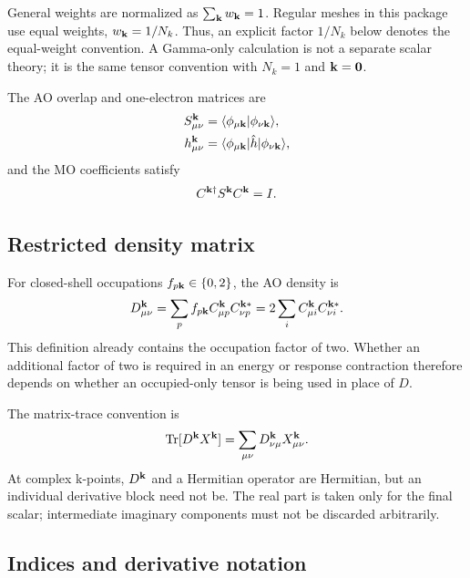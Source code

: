 General weights are normalized as $\sum_{\mathbf{k}} w_{\mathbf{k}}=1$.  Regular meshes in this
package use equal weights, $w_{\mathbf{k}}=1/N_k$.  Thus, an explicit factor $1/N_k$
below denotes the equal-weight convention.  A Gamma-only calculation is not a
separate scalar theory; it is the same tensor convention with $N_k=1$ and
$\mathbf{k}=\mathbf0$.

The AO overlap and one-electron matrices are
\begin{align}
  S_{\mu\nu}^{\mathbf{k}}
  &=\langle\phi_{\mu\mathbf{k}}|\phi_{\nu\mathbf{k}}\rangle,\\
  h_{\mu\nu}^{\mathbf{k}}
  &=\langle\phi_{\mu\mathbf{k}}|\hat h|\phi_{\nu\mathbf{k}}\rangle,
  \label{eq:ao-matrices}
\end{align}
and the MO coefficients satisfy
\begin{equation}
  C^{\mathbf{k}\dagger}S^{\mathbf{k}}C^{\mathbf{k}}=I.
  \label{eq:mo-orthonormality}
\end{equation}

\subsection{Restricted density matrix}

For closed-shell occupations $f_{p\mathbf{k}}\in\{0,2\}$, the AO density is
\begin{equation}
  D_{\mu\nu}^{\mathbf{k}}
  =\sum_p f_{p\mathbf{k}}C_{\mu p}^{\mathbf{k}}C_{\nu p}^{\mathbf{k} *}
  =2\sum_i C_{\mu i}^{\mathbf{k}}C_{\nu i}^{\mathbf{k} *}.
  \label{eq:restricted-density}
\end{equation}
This definition already contains the occupation factor of two.  Whether an
additional factor of two is required in an energy or response contraction
therefore depends on whether an occupied-only tensor is being used in place of
$D$.

The matrix-trace convention is
\begin{equation}
  \operatorname{Tr}[D^{\mathbf{k}}X^{\mathbf{k}}]
  =\sum_{\mu\nu}D_{\nu\mu}^{\mathbf{k}}X_{\mu\nu}^{\mathbf{k}}.
  \label{eq:trace-convention}
\end{equation}
At complex k-points, $D^{\mathbf{k}}$ and a Hermitian operator are Hermitian, but an
individual derivative block need not be.  The real part is taken only for the
final scalar; intermediate imaginary components must not be discarded
arbitrarily.

\subsection{Indices and derivative notation}

